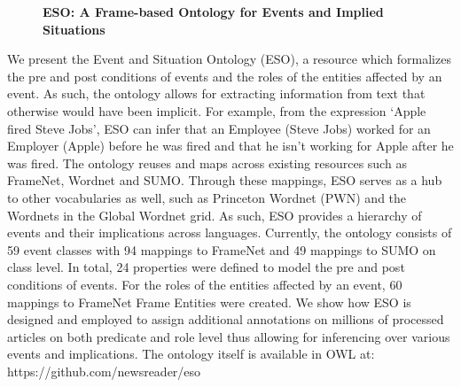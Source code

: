 \documentclass[10pt, a4paper, twopage, headinclude, footinclude, BCOR5mm]{book}
\begin{document}
\newpage

\begin{figure}[t!]
\centering
\large\textbf{ESO: A Frame-based Ontology for Events and Implied Situations}
\vspace*{0.5cm}
\end{figure}


\begin{table}[t!]
\end{table} 
\noindent
We present the Event and Situation Ontology (ESO), a resource which formalizes the pre and post conditions of events and the roles of the entities affected by an event. As such, the ontology allows for extracting information from text that otherwise would have been implicit. For example, from the expression ‘Apple fired Steve Jobs’, ESO can infer that an Employee (Steve Jobs) worked for an Employer (Apple) before he was fired and that he isn’t working for Apple after he was fired.  The ontology reuses and maps across existing resources such as FrameNet, Wordnet and SUMO. Through these mappings, ESO serves as a hub to other vocabularies as well, such as Princeton Wordnet (PWN) and the Wordnets in the Global Wordnet grid. As such, ESO provides a hierarchy of events and their implications across languages.  Currently, the ontology consists of  59 event classes with 94 mappings to FrameNet and  49 mappings to SUMO on class level. In total, 24 properties were defined to model the pre and post conditions of events. For the roles of the entities affected by an event, 60 mappings to FrameNet Frame Entities were created.   We show how ESO is designed and employed to assign additional annotations on millions of processed articles on both predicate and role level thus allowing for inferencing over various events and implications.  The ontology itself is available in OWL at: https://github.com/newsreader/eso   
\end{document}
